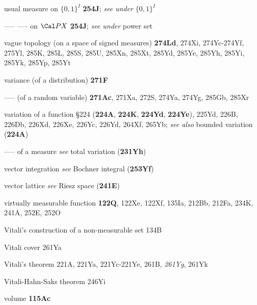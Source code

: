 





usual measure on $\{0,1\}^I$ {\bf 254J};
  {\it see under} $\{0,1\}^I$




----- ----- on $\Cal PX$ {\bf 254J};  {\it see under} power set





\indexmedskip

vague topology (on a space of signed measures) {\bf 274Ld}, 274Xi,
274Yc-274Yf, 
275Yl, 285K, 285L, 285S, 285U, 285Xn, 285Xt, 285Yd, 285Ye, 285Yh, 285Yi,
285Yk, 285Yp, 285Yt





variance (of a distribution) {\bf 271F}


----- (of a random variable) {\bf 271Ac}, 271Xa, 272S,
274Ya, 274Yg, 285Gb, 285Xr


variation of a function \S224 ({\bf 224A}, {\bf 224K}, {\bf 224Yd},
{\bf 224Ye}), 225Yd, 226B, 226Db, 226Xd, 226Xe, 226Yc, 226Yd,
264Xf, 265Yb;
  {\it see also} bounded variation ({\bf 224A})


----- of a measure {\it see} total variation ({\bf 231Yh})




vector integration {\it see} Bochner integral ({\bf 253Yf})


vector lattice {\it see} Riesz space ({\bf 241E})













virtually measurable function {\bf 122Q}, 122Xe, 122Xf, 135Ia,
  212Bb, 212Fa, 234K, 241A, 252E, 252O

Vitali's construction of a non-measurable set 134B

Vitali cover 261Ya


Vitali's theorem 221A, 221Ya,
221Yc-221Ye, 
261B, {\it 261Yg}, 261Yk


Vitali-Hahn-Saks theorem 246Yi




volume {\bf 115Ac}

